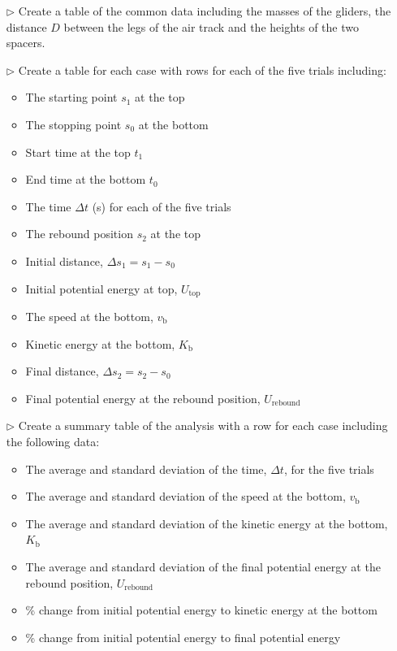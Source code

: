 \begin{itemize}
\item[$\triangleright$] Create a table of the common data including the masses of the gliders, the distance $D$ between the legs of the air track and the heights of the two spacers.

\item[$\triangleright$] Create a table for each case with rows for each of the five trials including:
  \begin{itemize}
  \item The starting point $s_1$ at the top
  \item The stopping point $s_0$ at the bottom
  \item Start time at the top $t_1$
  \item End time at the bottom $t_0$
  \item The time $\Delta t$ (s) for each of the five trials
  \item The rebound position $s_2$ at the top
  \item Initial distance, $\Delta s_1=s_1-s_0$
  \item Initial potential energy at top, $U_{\mbox{top}}$
  \item The speed at the bottom, $v_{\mbox{b}}$
  \item Kinetic energy at the bottom, $K_{\mbox{b}}$
  \item Final distance, $\Delta s_2=s_2-s_0$
  \item Final potential energy at the rebound position, $U_{\mbox{rebound}}$
  \end{itemize}


\item[$\triangleright$] Create a summary table of the analysis with a row for each case including the following data:
  \begin{itemize}
  \item The average and standard deviation of the time, $\Delta t$, for the five trials
  \item The average and standard deviation of the speed at the bottom, $v_{\mbox{b}}$
  \item The average and standard deviation of the kinetic energy at the bottom, $K_{\mbox{b}}$
  \item The average and standard deviation of the final potential energy at the rebound position, $U_{\mbox{rebound}}$
  \item \% change from initial potential energy to kinetic energy at the bottom
  \item \% change from initial potential energy to final potential energy
  \end{itemize}


\end{itemize}
